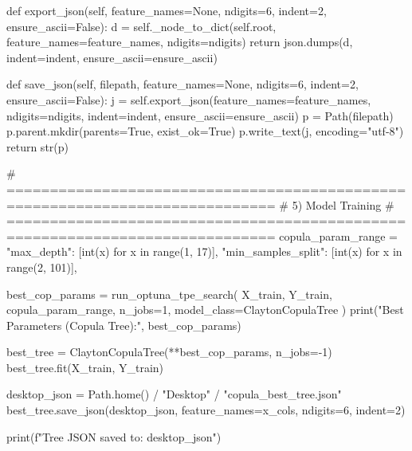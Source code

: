     def export_json(self, feature_names=None, ndigits=6, indent=2, ensure_ascii=False):
        d = self._node_to_dict(self.root, feature_names=feature_names, ndigits=ndigits)
        return json.dumps(d, indent=indent, ensure_ascii=ensure_ascii)

    def save_json(self, filepath, feature_names=None, ndigits=6, indent=2, ensure_ascii=False):
        j = self.export_json(feature_names=feature_names, ndigits=ndigits, indent=indent, ensure_ascii=ensure_ascii)
        p = Path(filepath)
        p.parent.mkdir(parents=True, exist_ok=True)
        p.write_text(j, encoding="utf-8")
        return str(p)


# =============================================================================
# 5) Model Training
# =============================================================================
copula_param_range = {
    "max_depth": [int(x) for x in range(1, 17)],
    "min_samples_split": [int(x) for x in range(2, 101)],
}

best_cop_params = run_optuna_tpe_search(
    X_train, Y_train,
    copula_param_range,
    n_jobs=1,
    model_class=ClaytonCopulaTree
)
print("Best Parameters (Copula Tree):", best_cop_params)

best_tree = ClaytonCopulaTree(**best_cop_params, n_jobs=-1)
best_tree.fit(X_train, Y_train)

desktop_json = Path.home() / "Desktop" / "copula_best_tree.json"
best_tree.save_json(desktop_json, feature_names=x_cols, ndigits=6, indent=2)

print(f"Tree JSON saved to: {desktop_json}")
